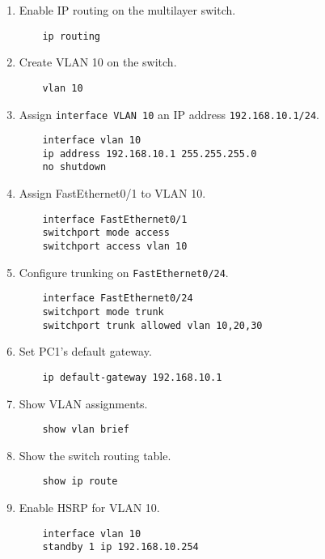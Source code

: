 \documentclass[a4paper]{book}
\begin{document}
\begin{enumerate}
    \item Enable IP routing on the multilayer switch.
    \begin{lstlisting}
    ip routing
    \end{lstlisting}

    \item Create VLAN 10 on the switch.
    \begin{lstlisting}
    vlan 10
    \end{lstlisting}

    \item Assign \texttt{interface VLAN 10} an IP address \texttt{192.168.10.1/24}.
    \begin{lstlisting}
    interface vlan 10
    ip address 192.168.10.1 255.255.255.0
    no shutdown
    \end{lstlisting}

    \item Assign FastEthernet0/1 to VLAN 10.
    \begin{lstlisting}
    interface FastEthernet0/1
    switchport mode access
    switchport access vlan 10
    \end{lstlisting}

    \item Configure trunking on \texttt{FastEthernet0/24}.
    \begin{lstlisting}
    interface FastEthernet0/24
    switchport mode trunk
    switchport trunk allowed vlan 10,20,30
    \end{lstlisting}

    \item Set PC1's default gateway.
    \begin{lstlisting}
    ip default-gateway 192.168.10.1
    \end{lstlisting}

    \item Show VLAN assignments.
    \begin{lstlisting}
    show vlan brief
    \end{lstlisting}

    \item Show the switch routing table.
    \begin{lstlisting}
    show ip route
    \end{lstlisting}

    \item Enable HSRP for VLAN 10.
    \begin{lstlisting}
    interface vlan 10
    standby 1 ip 192.168.10.254
    \end{lstlisting}


\end{enumerate}
\end{document}

